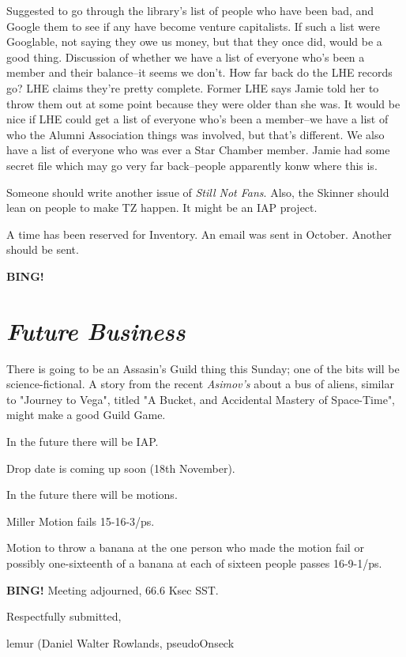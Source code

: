 \documentclass[10pt]{article}
\newcommand{\bing}{{\bf BING!} }
\newcommand{\goto}[1]{\bing \vskip 12pt \section*{{\em{#1}}}}
\begin{document}
Suggested to go through the library's list of people who have been bad, and Google them to see if any have become venture capitalists.  If such a list were Googlable, not saying they owe us money, but that they once did, would be a good thing.  Discussion of whether we have a list of everyone who's been a member and their balance--it seems we don't.  How far back do the LHE records go?  LHE claims they're pretty complete.  Former LHE says Jamie told her to throw them out at some point because they were older than she was.  It would be nice if LHE could get a list of everyone who's been a member--we have a list of who the Alumni Association things was involved, but that's different.  We also have a list of everyone who was ever a Star Chamber member.  Jamie had some secret file which may go very far back--people apparently konw where this is.

Someone should write another issue of \emph{Still Not Fans}.  Also, the Skinner should lean on people to make TZ happen.  It might be an IAP project.

A time has been reserved for Inventory.  An email was sent in October.  Another should be sent.

\goto{Future Business}

There is going to be an Assasin's Guild thing this Sunday; one of the bits will be science-fictional.  A story from the recent \emph{Asimov's} about a bus of aliens, similar to "Journey to Vega", titled "A Bucket, and Accidental Mastery of Space-Time", might make a good Guild Game.

In the future there will be IAP.

Drop date is coming up soon (18th November).

In the future there will be motions.

Miller Motion fails 15-16-3/ps.

Motion to throw a banana at the one person who made the motion fail or possibly one-sixteenth of a banana at each of sixteen people passes 16-9-1/ps.

\bing
\noindent
Meeting adjourned, 66.6 Ksec SST.

\vspace{18pt}

\centerline{Respectfully submitted,}
\centerline{lemur (Daniel Walter Rowlands, pseudoOnseck}
\end{document}
